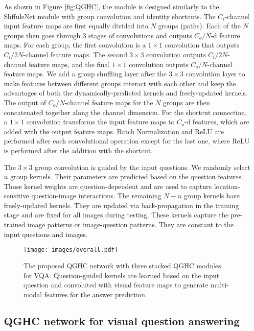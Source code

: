\documentclass[runningheads]{llncs}
\begin{document}
As shown in Figure \ref{fig:QGHC}, the module is designed similarly to the ShffuleNet \cite{zhang2017shufflenet} module with group convolution and identity shortcuts. The $C_i$-channel input feature maps are first equally divided into $N$ groups (paths). Each of the $N$ groups then goes through 3 stages of convolutions and outputs $C_o/N$-d feature maps. For each group, the first convolution is a $1\times 1$ convolution that outputs $C_i /2N$-channel feature maps. The second $3\times 3$ convolution outputs $C_i /2N$-channel feature maps, and the final $1\times 1$ convolution outputs $C_o/N$-channel feature maps. We add a group shuffling layer after the $3\times 3$ convolution layer to make features between different groups interact with each other and keep the advantages of both the dynamically-predicted kernels and freely-updated kernels. The output of $C_o/N$-channel feature maps for the $N$ groups are then concatenated together along the channel dimension. For the shortcut connection, a $1\times 1$ convolution transforms the input feature maps to $C_o$-d features, which are added with the output feature maps. Batch Normalization and ReLU are performed after each convolutional operation except for the last one, where ReLU is performed after the addition with the shortcut.


The $3 \times 3$ group convolution is guided by the input questions. We randomly select $n$ group kernels. Their parameters are predicted based on the question features.
Those kernel weights are question-dependent and are used to capture location-sensitive question-image interactions. 
The remaining $N-n$ group kernels have freely-updated kernels. They are updated via back-propagation in the training stage and are fixed for all images during testing. These kernels capture the pre-trained image patterns or image-question patterns. They are constant to the input questions and images.

\begin{figure*}[t!]
        \begin{center}
                \texttt{[image: images/overall.pdf]}
        \end{center}
        \caption{The proposed QGHC network with three stacked QGHC modules for VQA. Question-guided kernels are learned based on the input question and convoluted with visual feature maps to generate multi-modal features for the answer prediction.}
        \label{fig:overall}
\end{figure*}

\subsection{QGHC network for visual question answering}
\label{sec:lghc_network}
\end{document}
